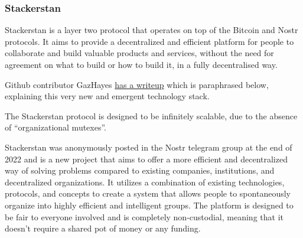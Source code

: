 \subsubsection{Stackerstan}
Stackerstan is a layer two protocol that operates on top of the Bitcoin and Nostr protocols. It aims to provide a decentralized and efficient platform for people to collaborate and build valuable products and services, without the need for agreement on what to build or how to build it, in a fully decentralised way.\par 
Github contributor GazHayes \href{https://github.com/Stackerstan/interfarce/issues/20#issuecomment-1369329734}{has a writeup} which is paraphrased below, explaining this very new and emergent technology stack.\par
The Stackerstan protocol is designed to be infinitely scalable, due to the absence of ``organizational mutexes''.\par 
Stackerstan was anonymously posted in the Nostr telegram group at the end of 2022 and is a new project that aims to offer a more efficient and decentralized way of solving problems compared to existing companies, institutions, and decentralized organizations. It utilizes a combination of existing technologies, protocols, and concepts to create a system that allows people to spontaneously organize into highly efficient and intelligent groups. The platform is designed to be fair to everyone involved and is completely non-custodial, meaning that it doesn't require a shared pot of money or any funding.
